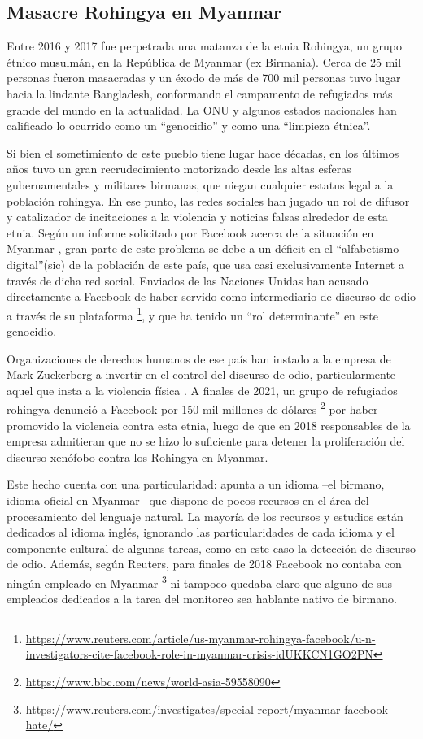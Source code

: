 \subsection{Masacre Rohingya en Myanmar}
%
Entre 2016 y 2017 fue perpetrada una matanza de la etnia Rohingya, un grupo étnico musulmán, en la República de Myanmar (ex Birmania). Cerca de 25 mil personas fueron masacradas y un éxodo de más de 700 mil personas tuvo lugar hacia la lindante Bangladesh, conformando el campamento de refugiados más grande del mundo en la actualidad. La ONU y algunos estados nacionales han calificado lo ocurrido como un ``genocidio'' y como una ``limpieza étnica''.


Si bien el sometimiento de este pueblo tiene lugar hace décadas, en los últimos años tuvo un gran recrudecimiento motorizado desde las altas esferas gubernamentales y militares birmanas, que niegan cualquier estatus legal a la población rohingya. En ese punto, las redes sociales han jugado un rol de difusor y catalizador de incitaciones a la violencia y noticias falsas alrededor de esta etnia. Según un informe solicitado por Facebook acerca de la situación en Myanmar \cite{warofka2018independent}, gran parte de este problema se debe a un déficit en el ``alfabetismo digital''(sic) de la población de este país, que usa casi exclusivamente Internet a través de dicha red social. Enviados de las Naciones Unidas han acusado directamente a Facebook de haber servido como intermediario de discurso de odio a través de su plataforma \footnote{\url{https://www.reuters.com/article/us-myanmar-rohingya-facebook/u-n-investigators-cite-facebook-role-in-myanmar-crisis-idUKKCN1GO2PN}}, y que ha tenido un ``rol determinante'' en este genocidio.

Organizaciones de derechos humanos de ese país han instado a la empresa de Mark Zuckerberg a invertir en el control del discurso de odio, particularmente aquel que insta a la violencia física \cite{irrawaddy2018zuckerberg}. A finales de 2021, un grupo de refugiados rohingya denunció a Facebook por 150 mil millones de dólares \footnote{\url{https://www.bbc.com/news/world-asia-59558090}} por haber promovido la violencia contra esta etnia, luego de que en 2018 responsables de la empresa admitieran que no se hizo lo suficiente para detener la proliferación del discurso xenófobo contra los Rohingya en Myanmar.

Este hecho cuenta con una particularidad: apunta a un idioma --el birmano, idioma oficial en Myanmar-- que dispone de pocos recursos en el área del procesamiento del lenguaje natural. La mayoría de los recursos y estudios están dedicados al idioma inglés, ignorando las particularidades de cada idioma y el componente cultural de algunas tareas, como en este caso la detección de discurso de odio. Además, según Reuters, para finales de 2018 Facebook no contaba con ningún empleado en Myanmar \footnote{\url{https://www.reuters.com/investigates/special-report/myanmar-facebook-hate/}} ni tampoco quedaba claro que alguno de sus empleados dedicados a la tarea del monitoreo sea hablante nativo de birmano.


